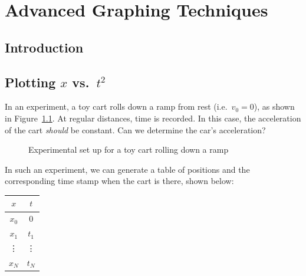 \chapter{Advanced Graphing Techniques}
%
%
%

\section{Introduction}


\section{Plotting $x$ vs.\ $t^2$}
In an experiment, a toy cart rolls down a ramp from rest (i.e.\ $v_0=0$), as
shown in Figure~\ref{fig:cart1}. At regular distances, time is recorded. In
this case, the acceleration of the cart \emph{should} be constant. Can we
determine the car's acceleration?
\begin{figure}[ht]
  \centering
  \caption{Experimental set up for a toy cart rolling down a ramp}
  \label{fig:cart1}
\end{figure}

In such an experiment, we can generate a table of positions and the
corresponding time stamp when the cart is there, shown below:
\begin{center}
  \begin{tabular}{c|c}
    $x$ & $t$ \\\hline
    $x_0$ & 0 \\
    $x_1$ & $t_1$\\
    \vdots & \vdots \\
    $x_N$ & $t_N$
  \end{tabular}
\end{center}
    
